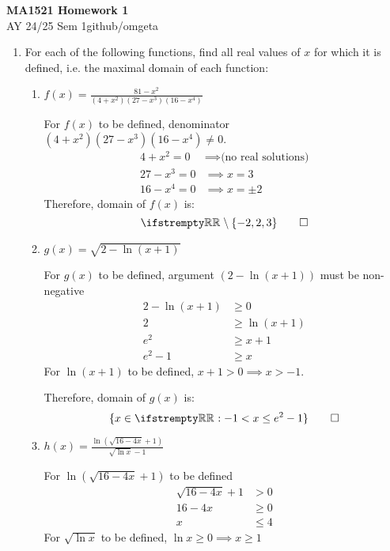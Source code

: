 \documentclass[12pt, a4paper]{article}
\newcommand{\mytitle}{MA1521 Homework 1}
\newcommand{\myauthor}{github/omgeta}
\newcommand{\mydate}{AY 24/25 Sem 1}
\begin{document}
\raggedright
\footnotesize
\begin{center}
{\normalsize{\textbf{\mytitle}}} \\
{\footnotesize{\mydate\hspace{2pt}\textemdash\hspace{2pt}\myauthor}}
\end{center}

\begin{enumerate}[Q\arabic*.]
  \item For each of the following functions, find all real values of $x$ for which it is defined, i.e.
the maximal domain of each function:
  \begin{enumerate}[(\alph*)]
    \item $\displaystyle f(x) = \frac{81 - x^2}{(4+x^2)(27-x^3)(16-x^4)}$

      For $f(x)$ to be defined, denominator $(4+x^2)(27-x^3)(16-x^4) \neq 0$.
    \begin{align*}
      4 + x^2 = 0 &\implies \text{(no real solutions)} \\
      27 - x^3 = 0 &\implies x = 3 \\
      16 - x^4 = 0 &\implies x = \pm 2
    \end{align*}
    Therefore, domain of \( f(x) \) is:
    \[
    \RR \setminus \{-2, 2, 3\} \qed
    \]
  \item $g(x) = \sqrt{2 - \ln(x+1)}$

    For $g(x)$ to be defined, argument $(2 - \ln(x+1))$ must be non-negative
    \begin{align*}
      2 - \ln(x+1) &\geq 0 \\
      2 &\geq \ln(x+1) \\
      e^2 &\geq x + 1 \\
      e^2 - 1 &\geq x
    \end{align*}
    For $\ln(x+1)$ to be defined, $x + 1 > 0 \implies x > -1 $. 
    
    Therefore, domain of $g(x)$ is:
    \[
      \{x \in \RR : -1 < x \leq e^2 - 1\} \qed
    \]

  \item $\displaystyle h(x) = \frac{\ln(\sqrt{16-4x}+1)}{\sqrt{\ln x}-1}$

      For $\ln(\sqrt{16-4x}+1)$ to be defined
        \begin{align*}
          \sqrt{16-4x} + 1 &> 0 \\
          16 - 4x &\geq 0 \\
          x &\leq 4
        \end{align*}
      For $\sqrt{\ln x}$ to be defined, $\ln x \geq 0 \implies x \geq 1$


\end{enumerate}
\end{enumerate}
\end{document}
